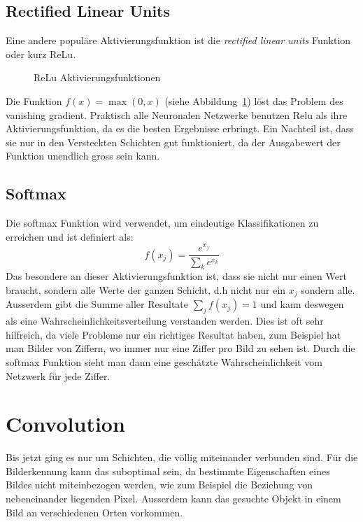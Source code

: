 \documentclass[12pt,a4paper]{report}
\begin{document}
\subsection{Rectified Linear Units}
Eine andere populäre Aktivierungsfunktion ist die \textit{rectified linear units} Funktion oder kurz ReLu.
\begin{figure}[h]
    \centering
{}
    \caption{ReLu Aktivierungsfunktionen}
    \label{fig:activation2}
\end{figure}
Die Funktion $f(x) = \max(0, x)$ (siehe Abbildung~\ref{fig:activation2}) löst das Problem des vanishing gradient.
Praktisch alle Neuronalen Netzwerke benutzen Relu als ihre Aktivierungsfunktion,
da es die besten Ergebnisse erbringt\cite{activations}.
Ein Nachteil ist, dass sie nur in den Versteckten Schichten gut funktioniert,
da der Ausgabewert der Funktion unendlich gross sein kann.
\subsection{Softmax}
Die softmax Funktion wird verwendet, um eindeutige Klassifikationen zu erreichen und ist definiert als:
\[f(x_j) = \frac{e^{x_j}}{\sum_k{e^{x_k}}}\]
Das besondere an dieser Aktivierungsfunktion ist, dass sie nicht nur einen Wert braucht, sondern alle Werte der ganzen Schicht,
d.h nicht nur ein $x_j$ sondern alle.
Ausserdem gibt die Summe aller Resultate $\sum_j f(x_j) = 1$ und kann deswegen als eine Wahrscheinlichkeitsverteilung verstanden werden.
Dies ist oft sehr hilfreich, da viele Probleme nur ein richtiges Resultat haben, zum Beispiel hat man Bilder von Ziffern,
wo immer nur eine Ziffer pro Bild zu sehen ist.
Durch die softmax Funktion sieht man dann eine geschätzte Wahrscheinlichkeit vom Netzwerk für jede Ziffer.
\section{Convolution}
Bis jetzt ging es nur um Schichten, die völlig miteinander verbunden sind.
Für die Bilderkennung kann das suboptimal sein, da bestimmte Eigenschaften eines Bildes nicht miteinbezogen werden,
wie zum Beispiel die Beziehung von nebeneinander liegenden Pixel.
Ausserdem kann das gesuchte Objekt in einem Bild an verschiedenen Orten vorkommen.
\end{document}
